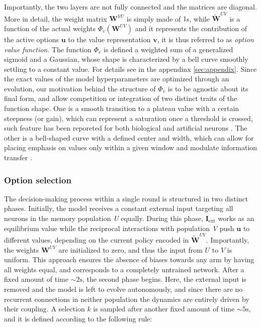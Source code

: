 \noindent Importantly, the two layers are not fully connected and the matrices are diagonal.
More in detail, the weight matrix $\textbf{W}^{VU}$ is simply made of $1$s, while $\tilde{\textbf{W}}^{UV}$ is a function of the actual weights $\Phi_{v}(\textbf{W}^{UV})$ and it represents the contribution of the active options $\textbf{u}$ to the value representation $\textbf{v}$, it is thus referred to as \textit{option value function}.
The function $\Phi_{v}$ is defined a weighted sum of a generalized sigmoid and a Gaussian, whose shape is characterized by a bell curve smoothly settling to a constant value. For details see in the appendinx \ref{sec:appendix}.
Since the exact values of the model hyperparameters are optimized through an evolution, our motivation behind the structure of $\Phi_{v}$ is to be agnostic about its final form, and allow competition or integration of two distinct traits of the function shape.
One is a smooth transition to a plateau value with a certain steepness (or gain), which can represent a saturation once a threshold is crossed, such feature has been reporeted for both biological and artificial neurons \cite{ockerFlexibleNeuralConnectivity2020, apicellaSurveyModernTrainable2021}.
The other is a bell-shaped curve with a defined center and width, which can allow for placing emphasis on values only within a given window and modulate information transfer \cite{millerCombinedMechanismsNeural2019}.

\subsubsection{Option selection}
The decision-making process within a single round is structured in two distinct phases. Initially, the model receives a constant external input targeting all neurons in the memory population \textit{U} equally.
During this phase, $\textbf{I}_{\text{ext}}$ works as an equilibrium value while the reciprocal interactions with population \textit{V} push $\textbf{u}$ to different values, depending on the current policy encoded in $\tilde{\textbf{W}}^{UV}$.
Importantly, the weights $\textbf{W}^{UV}$ are initialized to zero, and thus the input from $U$ to $V$ is uniform. This approach ensures the absence of biases towards any arm by having all weights equal, and corresponds to a completely untrained network.
After a fixed amount of time $\sim 2 \text{s}$, the second phase begins. Here, the external input is removed and the model is left to evolve autonomously, and since there are no recurrent connections in neither population the dynamics are entirely driven by their coupling.
A selection $k$ is sampled after another fixed amount of time $\sim 5 \text{s}$, and it is defined according to the following rule:

